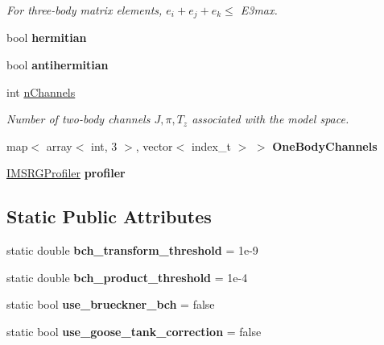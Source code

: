 \begin{DoxyCompactItemize}
\begin{DoxyCompactList}\small\item\em For three-\/body matrix elements, $ e_i + e_j + e_k \leq $ E3max. \end{DoxyCompactList}\item 
bool {\bfseries hermitian}\hypertarget{classOperator_ad46a54204c51cf5c82e4c489217bd2c1}{}\label{classOperator_ad46a54204c51cf5c82e4c489217bd2c1}

\item 
bool {\bfseries antihermitian}\hypertarget{classOperator_a86dd30fca215948dd9307fa45b7a2e32}{}\label{classOperator_a86dd30fca215948dd9307fa45b7a2e32}

\item 
int \hyperlink{classOperator_a710cd3c6107a4497e90a04c1f3d2b15f}{n\+Channels}\hypertarget{classOperator_a710cd3c6107a4497e90a04c1f3d2b15f}{}\label{classOperator_a710cd3c6107a4497e90a04c1f3d2b15f}

\begin{DoxyCompactList}\small\item\em Number of two-\/body channels $ J,\pi,T_z $ associated with the model space. \end{DoxyCompactList}\item 
map$<$ array$<$ int, 3 $>$, vector$<$ index\+\_\+t $>$ $>$ {\bfseries One\+Body\+Channels}\hypertarget{classOperator_a380992b76bd3ef1fc2c6dd7e2debf8ff}{}\label{classOperator_a380992b76bd3ef1fc2c6dd7e2debf8ff}

\item 
\hyperlink{classIMSRGProfiler}{I\+M\+S\+R\+G\+Profiler} {\bfseries profiler}\hypertarget{classOperator_a9bc51c77e4b73736241fd8cedea05cc3}{}\label{classOperator_a9bc51c77e4b73736241fd8cedea05cc3}

\end{DoxyCompactItemize}
\subsection*{Static Public Attributes}
\begin{DoxyCompactItemize}
\item 
static double {\bfseries bch\+\_\+transform\+\_\+threshold} = 1e-\/9\hypertarget{classOperator_af4743d3c6e99ebf1915b348447c8e688}{}\label{classOperator_af4743d3c6e99ebf1915b348447c8e688}

\item 
static double {\bfseries bch\+\_\+product\+\_\+threshold} = 1e-\/4\hypertarget{classOperator_ad4a2ba438f3286ef22cc06b61f745993}{}\label{classOperator_ad4a2ba438f3286ef22cc06b61f745993}

\item 
static bool {\bfseries use\+\_\+brueckner\+\_\+bch} = false\hypertarget{classOperator_a70e74e9e54e0f21a64c6ba8b1e476fdd}{}\label{classOperator_a70e74e9e54e0f21a64c6ba8b1e476fdd}

\item 
static bool {\bfseries use\+\_\+goose\+\_\+tank\+\_\+correction} = false\hypertarget{classOperator_a3c7ae7a267c1c9d48655012a16c68b29}{}\label{classOperator_a3c7ae7a267c1c9d48655012a16c68b29}

\end{DoxyCompactItemize}
